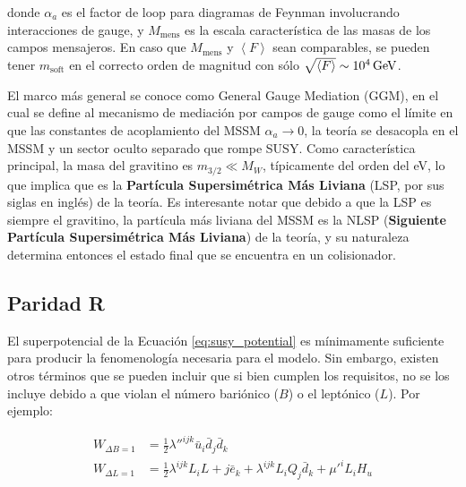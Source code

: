 \noindent
donde $\alpha_a$ es el factor de loop para diagramas de Feynman involucrando interacciones de gauge, y $M_\text{mens}$ es la escala característica de las masas de los campos mensajeros. En
caso que $M_\text{mens}$ y $\left< F \right>$ sean comparables, se pueden tener $m_{\text{soft}}$ en el correcto
orden de magnitud con sólo $\sqrt{\left< F \right>}\sim 10^4\,\text{GeV}$.

El marco más general se conoce como General Gauge Mediation (GGM), en el
cual se define al mecanismo de mediación por campos de gauge como el límite en
que las constantes de acoplamiento del MSSM $\alpha_a\to 0$, la teoría se desacopla en el
MSSM y un sector oculto separado que rompe SUSY. Como característica principal, la masa del
gravitino es $m_{3/2} \ll M_W$, típicamente del orden del eV, lo que implica que es la \textbf{Partícula Supersimétrica Más Liviana} (LSP, por sus siglas en inglés) 
de la teoría. Es interesante notar que debido a que la LSP es siempre el gravitino, la
partícula más liviana del MSSM es la NLSP (\textbf{Siguiente Partícula Supersimétrica Más Liviana}) de la teoría, y su naturaleza determina
entonces el estado final que se encuentra en un colisionador.

\subsection{Paridad R}

El superpotencial de la Ecuación \ref{eq:susy_potential} es mínimamente suficiente para producir la fenomenología necesaria para el modelo. Sin embargo, existen otros términos que se pueden incluir que si bien cumplen los requisitos, no se los incluye debido a que violan el número bariónico ($B$) o el leptónico ($L$). Por ejemplo:

\begin{equation}
	\begin{split}
		W_{\Delta B = 1} & = \frac{1}{2}\lambda ''^{ijk}\bar{u}_i\bar{d}_j\bar{d}_k \\
		W_{\Delta L = 1} & = \frac{1}{2}\lambda^{ijk}L_iL+j\bar{e}_k + \lambda^{ijk}L_iQ_j\bar{d}_k + \mu '^{i}L_i H_u \\
	\end{split}
	\label{eq:lb_viol}
\end{equation}

